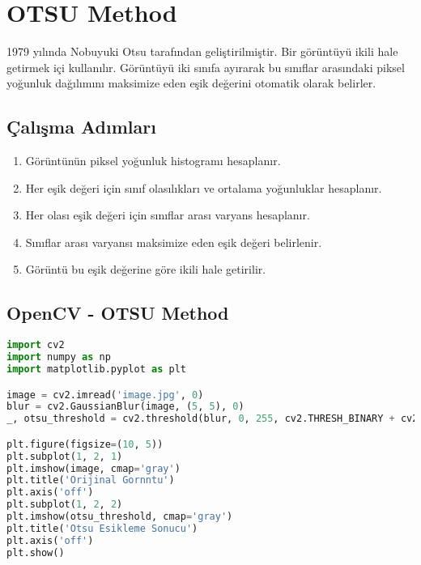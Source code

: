 \section{OTSU Method}
1979 yılında Nobuyuki Otsu tarafından geliştirilmiştir. Bir görüntüyü ikili hale getirmek içi kullanılır. Görüntüyü iki sınıfa ayırarak bu sınıflar arasındaki piksel yoğunluk dağılımını maksimize eden eşik değerini otomatik olarak belirler. 

\subsection{Çalışma Adımları}
\begin{enumerate}
	\item Görüntünün piksel yoğunluk histogramı hesaplanır.
	\item Her eşik değeri için sınıf olasılıkları ve ortalama yoğunluklar hesaplanır.
	\item Her olası eşik değeri için sınıflar arası varyans hesaplanır.
	\item Sınıflar arası varyansı maksimize eden eşik değeri belirlenir.
	\item Görüntü bu eşik değerine göre ikili hale getirilir.
\end{enumerate}

\subsection{OpenCV - OTSU Method}
\begin{lstlisting}[language=Python]
import cv2
import numpy as np
import matplotlib.pyplot as plt

image = cv2.imread('image.jpg', 0)
blur = cv2.GaussianBlur(image, (5, 5), 0)
_, otsu_threshold = cv2.threshold(blur, 0, 255, cv2.THRESH_BINARY + cv2.THRESH_OTSU)

plt.figure(figsize=(10, 5))
plt.subplot(1, 2, 1)
plt.imshow(image, cmap='gray')
plt.title('Orijinal Gornntu')
plt.axis('off')
plt.subplot(1, 2, 2)
plt.imshow(otsu_threshold, cmap='gray')
plt.title('Otsu Esikleme Sonucu')
plt.axis('off')
plt.show()
\end{lstlisting}

\newpage